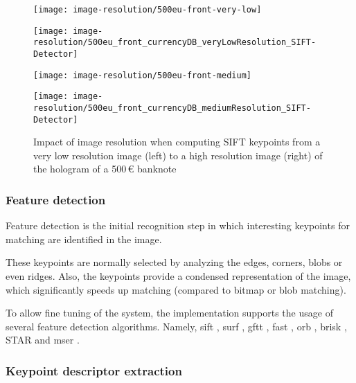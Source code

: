 \begin{figure}[H]
	\centering
	\begin{minipage}[h]{.249\textwidth}
		\centering
		\texttt{[image: image-resolution/500eu-front-very-low]}
	\end{minipage}\hfill
	\begin{minipage}[h]{.249\textwidth}
		\centering
		\texttt{[image: image-resolution/500eu\_front\_currencyDB\_veryLowResolution\_SIFT-Detector]}
	\end{minipage}\hfill
	\begin{minipage}[h]{.249\textwidth}
		\centering
		\texttt{[image: image-resolution/500eu-front-medium]}
	\end{minipage}\hfill
	\begin{minipage}[h]{.249\textwidth}
		\centering
		\texttt{[image: image-resolution/500eu\_front\_currencyDB\_mediumResolution\_SIFT-Detector]}
	\end{minipage}
	\caption{Impact of image resolution when computing SIFT keypoints from a very low resolution image (left) to a high resolution image (right) of the hologram of a 500\,\euro{} banknote}
	\label{fig:banknote-500-front-resolution-difference}
\end{figure}


\subsubsection{Feature detection}\label{sec:feature-detection}
Feature detection is the initial recognition step in which interesting keypoints for matching are identified in the image.

These keypoints are normally selected by analyzing the edges, corners, blobs or even ridges. Also, the keypoints provide a condensed representation of the image, which significantly speeds up matching (compared to bitmap or blob matching).

To allow fine tuning of the system, the implementation supports the usage of several feature detection algorithms. Namely, \gls{sift} \cite{Lowe2004}, \gls{surf} \cite{Bay2006}, \gls{gftt} \cite{Shi1994}, \gls{fast} \cite{Rosten2006}, \gls{orb} \cite{Rublee2011}, \gls{brisk} \cite{Leutenegger2011}, STAR \cite{Agrawal2008} and \gls{mser} \cite{Matas2004}.


\subsubsection{Keypoint descriptor extraction}\label{sec:keypoint-descriptor-extraction}

